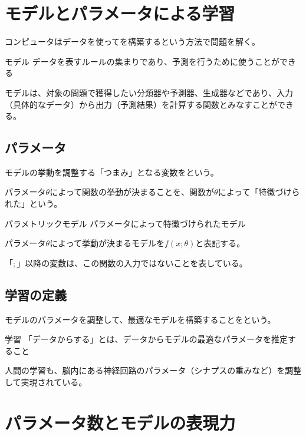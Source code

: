 \documentclass[../../../topic_machine-learning]{subfiles}
\begin{document}
\sectionline
\section{モデルとパラメータによる学習}

コンピュータはデータを使ってを構築するという方法で問題を解く。

\begin{definition}{モデル}
  データを表すルールの集まりであり、予測を行うために使うことができる
\end{definition}

モデルは、対象の問題で獲得したい分類器や予測器、生成器などであり、入力（具体的なデータ）から出力（予測結果）を計算する関数とみなすことができる。

\subsection{パラメータ}

モデルの挙動を調整する「つまみ」となる変数をという。

パラメータ$\theta$によって関数の挙動が決まることを、関数が$\theta$によって「特徴づけられた」という。

\begin{definition}{パラメトリックモデル}
  パラメータによって特徴づけられたモデル
\end{definition}

パラメータ$\theta$によって挙動が決まるモデルを$f(x; \theta)$と表記する。

「$;$」以降の変数は、この関数の入力ではないことを表している。

\subsection{学習の定義}

モデルのパラメータを調整して、最適なモデルを構築することをという。

\begin{definition}{学習}
  「データからする」とは、データからモデルの最適なパラメータを推定すること
\end{definition}

人間の学習も、脳内にある神経回路のパラメータ（シナプスの重みなど）を調整して実現されている。

\sectionline
\section{パラメータ数とモデルの表現力}
\end{document}

